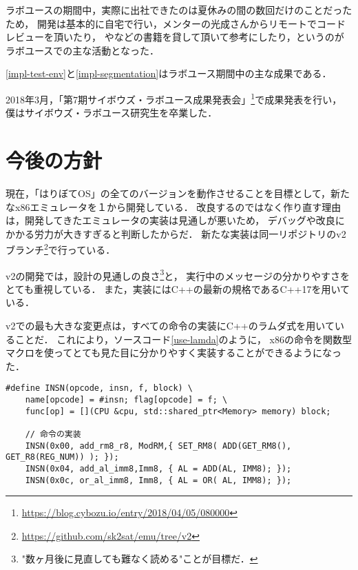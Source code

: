 \documentclass[10pt,a4j]{jsarticle}
\begin{document}
ラボユースの期間中，実際に出社できたのは夏休みの間の数回だけのことだったため，
開発は基本的に自宅で行い，メンターの光成さんからリモートでコードレビューを頂いたり，
\cite{read-486}や\cite{effective-cpp}などの書籍を貸して頂いて参考にしたり，というのがラボユースでの主な活動となった．

\ref{impl-test-env}と\ref{impl-segmentation}はラボユース期間中の主な成果である．

2018年3月，「第7期サイボウズ・ラボユース成果発表会」\footnote{\url{https://blog.cybozu.io/entry/2018/04/05/080000}}で成果発表を行い，
僕はサイボウズ・ラボユース研究生を卒業した．

\section{今後の方針}

現在，「はりぼてOS」の全てのバージョンを動作させることを目標として，新たなx86エミュレータを１から開発している．
改良するのではなく作り直す理由は，開発してきたエミュレータの実装は見通しが悪いため，
デバッグや改良にかかる労力が大きすぎると判断したからだ．
新たな実装は同一リポジトリのv2ブランチ\footnote{\url{https://github.com/sk2sat/emu/tree/v2}}で行っている．

v2の開発では，設計の見通しの良さ\footnote{"数ヶ月後に見直しても難なく読める"ことが目標だ．}と，
実行中のメッセージの分かりやすさをとても重視している．
また，実装にはC++の最新の規格であるC++17を用いている．

v2での最も大きな変更点は，すべての命令の実装にC++のラムダ式を用いていることだ．
これにより，ソースコード\ref{use-lamda}のように，
x86の命令を関数型マクロを使ってとても見た目に分かりやすく実装することができるようになった．

\begin{lstlisting}[caption=ラムダ式を使った命令の実装の一部,label=use-lamda]
#define INSN(opcode, insn, f, block) \
	name[opcode] = #insn; flag[opcode] = f; \
	func[op] = [](CPU &cpu, std::shared_ptr<Memory> memory) block;

	// 命令の実装
	INSN(0x00, add_rm8_r8, ModRM,{ SET_RM8( ADD(GET_RM8(), GET_R8(REG_NUM)) ); });
	INSN(0x04, add_al_imm8,Imm8, { AL = ADD(AL, IMM8); });
	INSN(0x0c, or_al_imm8, Imm8, { AL = OR( AL, IMM8); });
\end{lstlisting}

\end{document}
